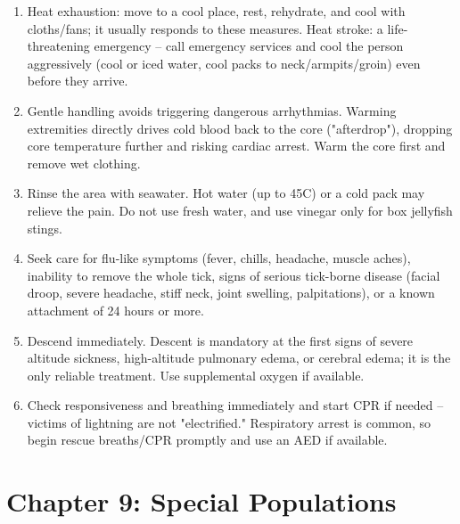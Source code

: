 \begin{enumerate}[leftmargin=*]
\item Heat exhaustion: move to a cool place, rest, rehydrate, and cool with cloths/fans; it usually responds to these measures. Heat stroke: a life-threatening emergency -- call emergency services and cool the person aggressively (cool or iced water, cool packs to neck/armpits/groin) even before they arrive.
\item Gentle handling avoids triggering dangerous arrhythmias. Warming extremities directly drives cold blood back to the core ("afterdrop"), dropping core temperature further and risking cardiac arrest. Warm the core first and remove wet clothing.
\item Rinse the area with seawater. Hot water (up to 45\textdegree C) or a cold pack may relieve the pain. Do not use fresh water, and use vinegar only for box jellyfish stings.
\item Seek care for flu-like symptoms (fever, chills, headache, muscle aches), inability to remove the whole tick, signs of serious tick-borne disease (facial droop, severe headache, stiff neck, joint swelling, palpitations), or a known attachment of 24 hours or more.
\item Descend immediately. Descent is mandatory at the first signs of severe altitude sickness, high-altitude pulmonary edema, or cerebral edema; it is the only reliable treatment. Use supplemental oxygen if available.
\item Check responsiveness and breathing immediately and start CPR if needed -- victims of lightning are not "electrified." Respiratory arrest is common, so begin rescue breaths/CPR promptly and use an AED if available.
\end{enumerate}

\section*{Chapter 9: Special Populations}

